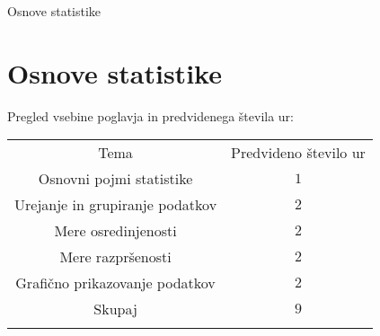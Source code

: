 \begin{priprava}{0}{}{}{Osnove statistike}{}{}

    \chapter{Osnove statistike}

    \Large{Pregled vsebine poglavja in predvidenega števila ur:}

    \begin{table}[H]
        \centering
        \begin{tabular}{||c|c||} 
        \hhline{|t:==:t|}
        \rowcolor[rgb]{0.843,0.718,0.718} 
        Tema  & Predvideno število ur   \\ 
        \hhline{|:==:|}
        Osnovni pojmi statistike & $1$    \\ 
        \hline
        Urejanje in grupiranje podatkov & $2$    \\ 
        \hline
        Mere osredinjenosti & $2$    \\ 
        \hline
        Mere razpršenosti & $2$     \\
        \hline
        Grafično prikazovanje podatkov & $2$     \\
        \hhline{|:==:|}
        Skupaj & $9$     \\
        \hhline{|b:==:b|}
        \end{tabular}
    \end{table}


\end{priprava}